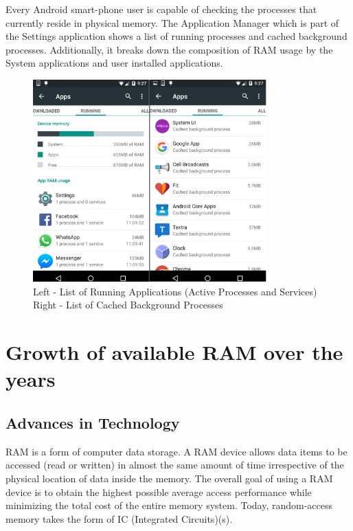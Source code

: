\documentclass[12pt]{uthesis-v12}  %
\begin{document}
				Every Android smart-phone user is capable of checking the processes that currently reside in physical memory. The Application Manager which is part of the Settings application shows a list of running processes and cached background processes. Additionally, it breaks down the composition of RAM usage by the System applications and user installed applications. 
				
				\begin{figure}[h]
					\centering
					\includegraphics[width = 90mm]{images/runningApps.png}
					\caption[Running Apps and Cached Background Processes]
					{Left - List of Running Applications (Active Processes and Services)\\
						Right - List of Cached Background Processes}
				\end{figure}		
		
			
		
					 	
	\section{Growth of available RAM over the years}
		
		\subsection{Advances in Technology}
			RAM is a form of computer data storage. A RAM device allows data items to be accessed (read or written) in almost the same amount of time irrespective of the physical location of data inside the memory. The overall goal of using a RAM device is to obtain the highest possible average access performance while minimizing the total cost of the entire memory system. Today, random-access memory takes the form of IC (Integrated Circuits)(s).
		
\end{document}
